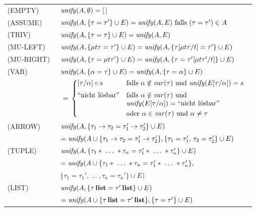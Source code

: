\begin{tabular}{ll}
  (EMPTY)\    & ${\text{\it unify\/}}(A,\emptyset) = [\,]$ \\[3mm]
  (ASSUME)\   & ${\text{\it unify\/}}(A,\{\tau = \tau'\} \cup E) = {\text{\it unify\/}}(A,E) \mbox{  falls } (\tau = \tau') \in A $\\[3mm]
  (TRIV)\     & ${\text{\it unify\/}}(A,\{\tau = \tau\} \cup E) = {\text{\it unify\/}}(A,E)$\\[3mm]
  (MU-LEFT)\  & ${\text{\it unify\/}}(A,\{\textbf{$\mu$} t\tau = \tau'\} \cup E) = 
                 {\text{\it unify\/}}(A,\{\tau [\textbf{$\mu$} t\tau/t] = \tau'\} \cup E)$\\[3mm]
  (MU-RIGHT)\ & ${\text{\it unify\/}}(A,\{\tau = \textbf{$\mu$} t\tau'\} \cup E) = 
                 {\text{\it unify\/}}(A,\{\tau = \tau' [\textbf{$\mu$} t\tau'/t]\} \cup E)$\\[3mm]
  (VAR)\      & ${\text{\it unify\/}}(A,\{\alpha = \tau\} \cup E) = {\text{\it unify\/}}(A,\{\tau = \alpha\} \cup E)$\\[2mm]
              & $\ =\, \bcase 
                        [\tau/\alpha] \circ s & 
                        \mbox{falls } \alpha \notin \var{\tau} \mbox{ und } 
                        \unify(E[\tau/\alpha]) = s \\[2mm]
                        \fail         & \mbox{falls } \alpha \notin \var{\tau} \mbox{ und }\\&
                        \unify(E[\tau/\alpha]) = \fail\\[1mm]
                        & \mbox{oder } \alpha \in \var{\tau} \mbox{ und } \alpha \neq \tau
                        \ecase\vspace{3mm}$\\
  (ARROW)\    & ${\text{\it unify\/}}(A,\{\tau_1 \to \tau_2 = \tau'_1 \to \tau'_2\} \cup E)$\\[1mm]
              & \quad $= {\text{\it unify\/}}(A \cup \{\tau_1 \to \tau_2 = \tau'_1 \to \tau'_2\},
                \{\tau_1 = \tau'_1,\,\tau_2 = \tau'_2\} \cup E)$\\[3mm]
  (TUPLE)\    & $\unify(A,\{\tau_1 *\ \ldots\ * \tau_n = \tau_1' *\ \ldots\ * \tau_n'\} \cup E)$\\[1mm]
              & \quad $= {\text{\it unify\/}}(A \cup \{\tau_1 *\ \ldots\ * \tau_n = \tau_1' *\ \ldots\ * \tau_n'\},$\\
              & \quad \quad $\{\tau_1 = \tau_1',\ \ldots\ , \tau_n = \tau_n'\} \cup E)$\\[3mm]
  (LIST)\     & ${\text{\it unify\/}}(A,\{\tau\,\textbf{list} = \tau'\,\textbf{list} \} \cup E)$\\[1mm]
              & \quad $= {\text{\it unify\/}}(A \cup \{\tau\,\textbf{list} = \tau'\,\textbf{list} \},
                         \{\tau = \tau' \} \cup E)$\\[3mm]

\end{tabular}
